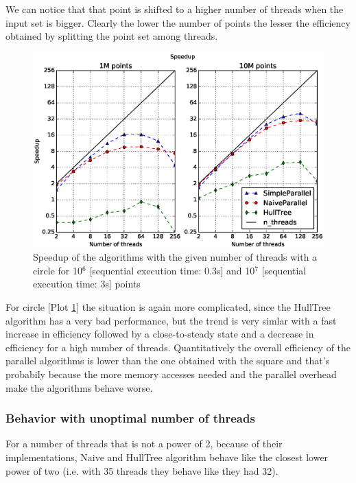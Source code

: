 \documentclass[letterpaper]{article}
\begin{document}
We can notice that that point is shifted to a higher number of threads when the input set is bigger. Clearly the lower the number of points the lesser the efficiency obtained by splitting the point set among threads.

\begin{figure}[!ht]\centering
  \includegraphics[scale=0.33]{./plots/speedup_xeon_circle_fixed_points.eps}
  \caption{Speedup of the algorithms with the given number of threads with a circle for 10$^6$ [sequential execution time: 0.3s] and 10$^7$ [sequential execution time: 3s] points\label{Threads speedup circle}}
\end{figure}

For circle [Plot \ref{Threads speedup circle}] the situation is again more complicated, since the HullTree algorithm has a very bad performance, but the trend is very simlar with a fast increase in efficiency followed by a close-to-steady state and a decrease in efficiency for a high number of threads.
Quantitatively the overall efficiency of the parallel algorithms is lower than the one obtained with the square and that's probabily because the more memory accesses needed and the parallel overhead make the algorithms behave worse.

\subsubsection{Behavior with unoptimal number of threads}

For a number of threads that is not a power of 2, because of their implementations, Naive and HullTree algorithm behave like the closest lower power of two (i.e. with 35 threads they behave like they had 32).
\end{document}
